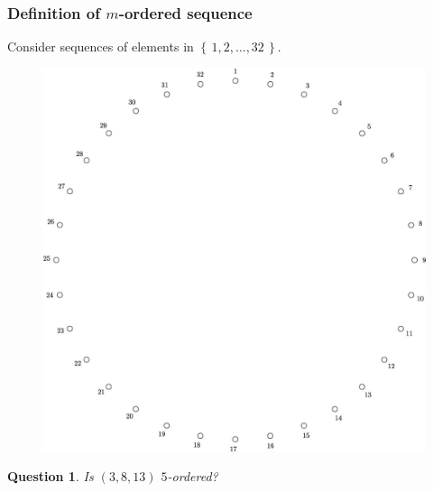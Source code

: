 \documentclass{beamer}
\theoremstyle{plain}
\newtheorem{question}[theorem]{Question}
\theoremstyle{definition}
\theoremstyle{remark}
\renewcommand{\'}{\hspace{0.5mm}'}		%
\renewcommand{\Set}[1]{\left\{\,#1\,\right\}}	%
\begin{document}
\begin{frame}
\frametitle{Definition of $m$-ordered sequence}

	Consider sequences of elements in $\Set{1,2,\hdots, 32}$. 

	\begin{figure}
		\includegraphics[scale=0.1]{circ_32_3_12_12_5.jpg}
	\end{figure}
	
	\begin{question}
		Is $(3,8,13)$ $5$-ordered?
	\end{question}
	
\end{frame}

\end{document}
